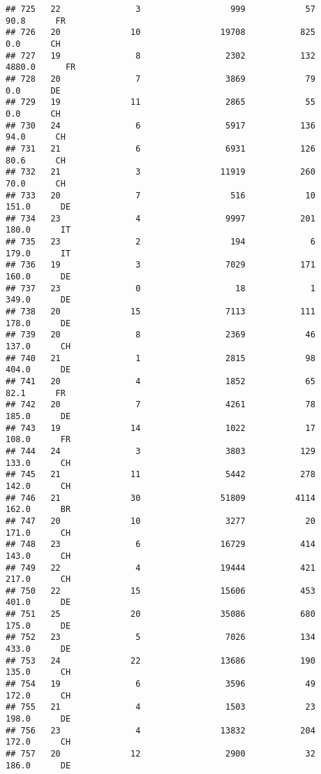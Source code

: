\documentclass[
]{article}
\begin{document}
\begin{verbatim}
## 725   22               3                  999            57     90.8      FR
## 726   20              10                19708           825      0.0      CH
## 727   19               8                 2302           132   4880.0      FR
## 728   20               7                 3869            79      0.0      DE
## 729   19              11                 2865            55      0.0      CH
## 730   24               6                 5917           136     94.0      CH
## 731   21               6                 6931           126     80.6      CH
## 732   21               3                11919           260     70.0      CH
## 733   20               7                  516            10    151.0      DE
## 734   23               4                 9997           201    180.0      IT
## 735   23               2                  194             6    179.0      IT
## 736   19               3                 7029           171    160.0      DE
## 737   23               0                   18             1    349.0      DE
## 738   20              15                 7113           111    178.0      DE
## 739   20               8                 2369            46    137.0      CH
## 740   21               1                 2815            98    404.0      DE
## 741   20               4                 1852            65     82.1      FR
## 742   20               7                 4261            78    185.0      DE
## 743   19              14                 1022            17    108.0      FR
## 744   24               3                 3803           129    133.0      CH
## 745   21              11                 5442           278    142.0      CH
## 746   21              30                51809          4114    162.0      BR
## 747   20              10                 3277            20    171.0      CH
## 748   23               6                16729           414    143.0      CH
## 749   22               4                19444           421    217.0      CH
## 750   22              15                15606           453    401.0      DE
## 751   25              20                35086           680    175.0      DE
## 752   23               5                 7026           134    433.0      DE
## 753   24              22                13686           190    135.0      CH
## 754   19               6                 3596            49    172.0      CH
## 755   21               4                 1503            23    198.0      DE
## 756   23               4                13832           204    172.0      CH
## 757   20              12                 2900            32    186.0      DE

\end{verbatim}
\end{document}
